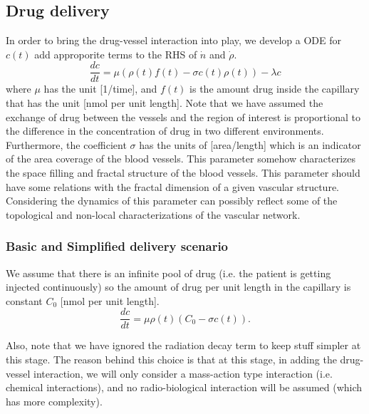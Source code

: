 

\subsection*{Drug delivery}
In order to bring the drug-vessel interaction into play, we develop a ODE for $c(t)$ add approporite terms to the RHS of $\dot{n}$ and $\dot{\rho}$.
\[ \frac{dc}{dt} = \mu (\rho(t)f(t) - \sigma c(t)\rho(t)) - \boxed{\lambda c} \]
where $\mu$ has the unit [1/time], and $f(t)$ is the amount drug inside the capillary that has the unit [nmol per unit length]. Note that we have assumed the exchange of drug between the vessels and the region of interest is proportional to the difference in the concentration of drug in two different environments. Furthermore, the coefficient $\sigma$ has the units of [area/length] which is an indicator of the area coverage of the blood vessels. This parameter somehow characterizes the space filling and fractal structure of the blood vessels. This parameter should have some relations with the fractal dimension of a given vascular structure. Considering the dynamics of this parameter can possibly reflect some of the topological and non-local characterizations of the vascular network.

\subsubsection*{Basic and Simplified delivery scenario}
We assume that there is an infinite pool of drug (i.e. the patient is getting injected continuously) so the amount of drug per unit length in the capillary is constant $C_0$ [nmol per unit length].
\[ \frac{dc}{dt} = \mu \rho(t)(C_0 - \sigma c(t)).  \]

Also, note that we have ignored the radiation decay term to keep stuff simpler at this stage. The reason behind this choice is that at this stage, in adding the drug-vessel interaction, we will only consider a mass-action type interaction (i.e. chemical interactions), and no radio-biological interaction will be assumed (which has more complexity).

